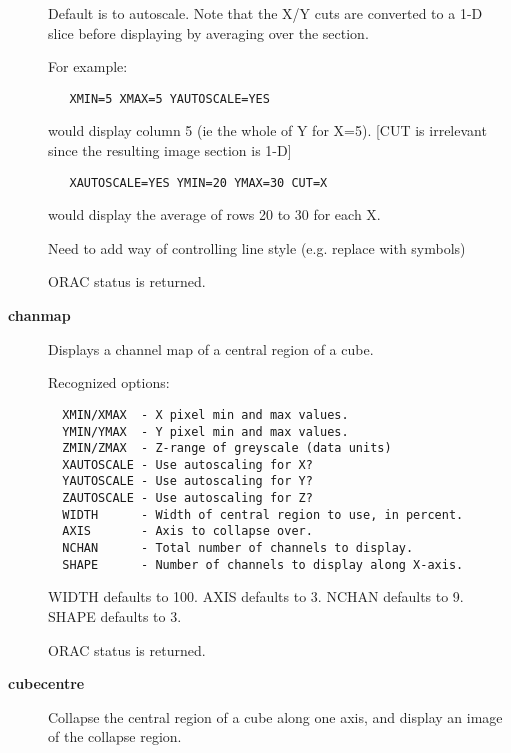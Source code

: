 \begin{description}
Default is to autoscale. Note that the X/Y cuts are converted
to a 1-D slice before displaying by averaging over the section.



For example:

\begin{verbatim}
   XMIN=5 XMAX=5 YAUTOSCALE=YES
\end{verbatim}


would display column 5 (ie the whole of Y for X=5).
[CUT is irrelevant since the resulting image section is 1-D]

\begin{verbatim}
   XAUTOSCALE=YES YMIN=20 YMAX=30 CUT=X
\end{verbatim}


would display the average of rows 20 to 30 for each X.



Need to add way of controlling line style (e.g. replace with symbols)



ORAC status is returned.


\item[{\textbf{chanmap}}] \mbox{}

Displays a channel map of a central region of a cube.



Recognized options:

\begin{verbatim}
  XMIN/XMAX  - X pixel min and max values.
  YMIN/YMAX  - Y pixel min and max values.
  ZMIN/ZMAX  - Z-range of greyscale (data units)
  XAUTOSCALE - Use autoscaling for X?
  YAUTOSCALE - Use autoscaling for Y?
  ZAUTOSCALE - Use autoscaling for Z?
  WIDTH      - Width of central region to use, in percent.
  AXIS       - Axis to collapse over.
  NCHAN      - Total number of channels to display.
  SHAPE      - Number of channels to display along X-axis.
\end{verbatim}


WIDTH defaults to 100. AXIS defaults to 3. NCHAN defaults to 9. SHAPE
defaults to 3.



ORAC status is returned.


\item[{\textbf{cubecentre}}] \mbox{}

Collapse the central region of a cube along one axis, and display an
image of the collapse region.




\end{description}
